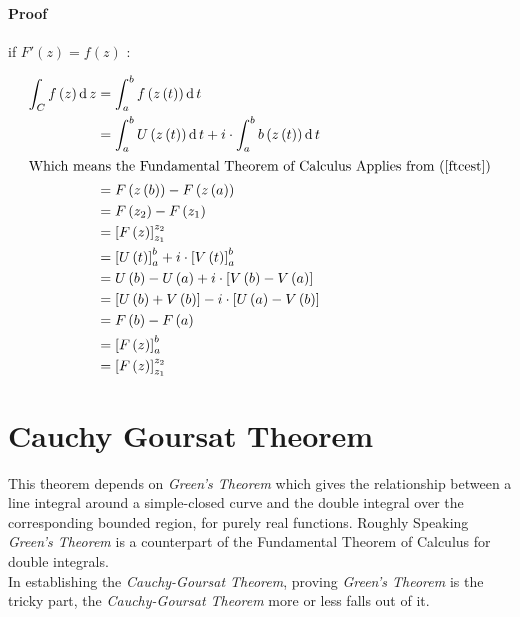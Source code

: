 \documentclass[class=article, crop=false]{standalone}
\begin{document}
   \paragraph{Proof}
   if $F'\left( z \right)  = f\left( z \right) $ :
   
   \begin{align*}
       \int^{}_{C} f\left( z \right)   \operatorname{d}z &=  \int^{b}_{a} f\left( z\left( t \right)  \right)   \operatorname{d}t \\
       &= \int^{b}_{a} U\left( z\left( t \right)  \right)   \operatorname{d}t + i\cdot \int^{b}_{a} b\left( z\left( t \right)  \right)   \operatorname{d}t\\
       \intertext{Which means the Fundamental Theorem of Calculus Applies from (\ref{ftcest})}
       &= F\left( z\left( b \right)  \right) - F\left( z\left( a \right)  \right) \\
       &=  F\left( z_2 \right) - F\left( z_1 \right) \\
       &= \left[ F\left( z \right)  \right]^{z_2}_{z_1} \\
       &= \left[ U\left( t \right)  \right]^{b}_{a} +  i \cdot  \left[ V\left( t \right)  \right]^{b}_{a} \\
       &= U\left( b \right) - U\left( a \right) +  i \cdot  \left[ V\left( b \right) - V\left( a \right)  \right] \\
       &= \left[ U\left( b \right)+  V\left( b   \right)  \right] -  i \cdot  \left[ U\left( a \right) - V\left( b \right)  \right] \\
       &= F\left( b \right) - F\left( a \right) \\
       &= \left[ F\left( z \right)  \right]^{b}_{a}\\
       &= \left[ F\left( z \right)  \right]^{z_2}_{z_1}
   \end{align*}

   \section{Cauchy Goursat Theorem}
   This theorem depends on \textit{Green's Theorem} which gives the relationship between a line integral around a simple-closed curve and the double integral over the corresponding bounded region, for purely real functions. Roughly Speaking \textit{Green's Theorem} is a counterpart of the Fundamental Theorem of Calculus for double integrals.\\

   In establishing the \textit{Cauchy-Goursat Theorem}, proving \textit{Green's Theorem} is the tricky part, the \textit{Cauchy-Goursat Theorem}  more or less falls out of it. 
\end{document}
